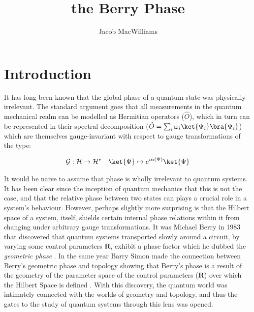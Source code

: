 \documentclass{article}
\title{the Berry Phase}
\author{Jacob MacWilliams}
\begin{document}
\maketitle
\newpage
\tableofcontents
\newpage

\section{Introduction \label{sec:intro}}

It has long been known that the global phase of a quantum state was physically irrelevant. The standard argument goes that all measurements in the quantum mechanical realm can be modelled as Hermitian operators ($\hat{O}$), which in turn can be represented in their spectral decomposition ($\hat{O} = \sum_{i} \omega_{i}\ket{\Psi_i}\bra{\Psi_i}$) which are themselves gauge-invariant with respect to gauge transformations of the type:

\begin{equation*}
  \mathcal{G}: \mathcal{H} \rightarrow \mathcal{H}^{*} \quad  \ket{\Psi} \mapsto e^{i\alpha(\Psi)}\ket{\Psi}
\end{equation*}

It would be naive to assume that phase is wholly irrelevant to quantum systems. It has been clear since the inception of quantum mechanics that this is not the case, and that the relative phase between two states can plays a crucial role in a system's behaviour. However, perhaps slightly more surprising is that the Hilbert space of a system, itself, shields certain internal phase relations within it from changing under arbitrary gauge transformations. It was Michael Berry in 1983 that discovered that quantum systems transported slowly around a circuit, by varying some control parameters $\bm{R}$, exhibit a phase factor which he dubbed the \textit{geometric phase} \cite{Berry1984}. In the same year Barry Simon made the connection between Berry's geometric phase and topology showing that Berry's phase is a result of the geometry of the parameter space of the control parameters ($\bm{R}$) over which the Hilbert Space is defined \cite{Simon1983}. With this discovery, the quantum world was intimately connected with the worlds of geometry and topology, and thus the gates to the study of quantum systems through this lens was opened.\\
\end{document}
